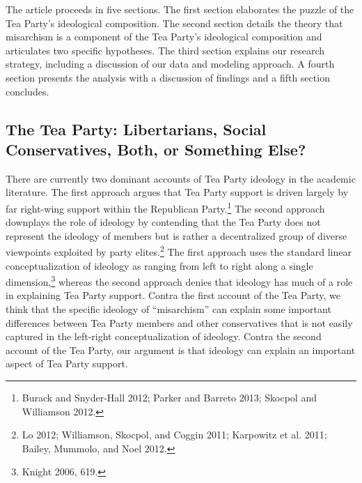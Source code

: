 \documentclass[12pt,]{article}
\begin{document}
The article proceeds in five sections. The first section elaborates the
puzzle of the Tea Party's ideological composition. The second section
details the theory that misarchism is a component of the Tea Party's
ideological composition and articulates two specific hypotheses. The
third section explains our research strategy, including a discussion of
our data and modeling approach. A fourth section presents the analysis
with a discussion of findings and a fifth section concludes.

\subsection{The Tea Party: Libertarians, Social Conservatives, Both, or
Something
Else?}\label{the-tea-party-libertarians-social-conservatives-both-or-something-else}

There are currently two dominant accounts of Tea Party ideology in the
academic literature. The first approach argues that Tea Party support is
driven largely by far right-wing support within the Republican
Party.\footnote{Burack and Snyder-Hall 2012; Parker and Barreto 2013;
  Skocpol and Williamson 2012. } The second approach downplays the role
of ideology by contending that the Tea Party does not represent the
ideology of members but is rather a decentralized group of diverse
viewpoints exploited by party elites.\footnote{Lo 2012; Williamson,
  Skocpol, and Coggin 2011; Karpowitz et al. 2011; Bailey, Mummolo, and
  Noel 2012. } The first approach uses the standard linear
conceptualization of ideology as ranging from left to right along a
single dimension,\footnote{Knight 2006, 619. } whereas the second
approach denies that ideology has much of a role in explaining Tea Party
support. Contra the first account of the Tea Party, we think that the
specific ideology of ``misarchism'' can explain some important
differences between Tea Party members and other conservatives that is
not easily captured in the left-right conceptualization of ideology.
Contra the second account of the Tea Party, our argument is that
ideology can explain an important aspect of Tea Party support.
\end{document}
